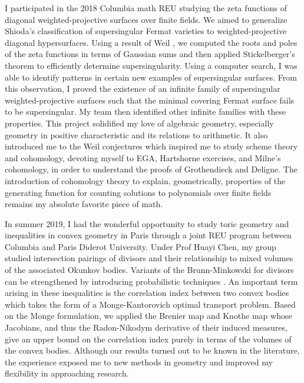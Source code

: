 \documentclass[11pt]{article}
\begin{document}
I participated in the 2018 Columbia math REU studying the zeta functions of diagonal weighted-projective surfaces over finite fields. We aimed to generalize Shioda’s classification of supersingular Fermat varieties  to weighted-projective diagonal hypersurfaces. Using a result of Weil , we computed the roots and poles of the zeta functions in terms of Gaussian sums and then applied Stickelberger's theorem to efficiently determine supersingularity. Using a computer search, I was able to identify patterns in certain new examples of supersingular surfaces. From this observation, I proved the existence of an infinite family of supersingular weighted-projective surfaces such that the minimal covering Fermat surface fails to be supersingular. My team then identified other infinite families with these properties. This project solidified my love of algebraic geometry, especially geometry in positive characteristic and its relations to arithmetic. It also introduced me to the Weil conjectures which inspired me to study scheme theory and \etale cohomology, devoting myself to EGA, Hartshorne exercises, and Milne's \etale cohomology, in order to understand the proofs of Grothendieck and Deligne. The introduction of \etale cohomology theory to explain, geometrically, properties of the generating function for counting solutions to polynomials over finite fields remains my absolute favorite piece of math. 
\par
In summer 2019, I had the wonderful opportunity to study toric geometry and inequalities in convex geometry in Paris through a joint REU program between Columbia and Paris Diderot University. Under Prof Huayi Chen, my group studied intersection pairings of divisors and their relationship to mixed volumes of the associated Okunkov bodies. Variants of the Brunn-Minkowski for divisors can be strengthened by introducing probabilistic techniques .
An important term arising in these inequalities is the correlation index between two convex bodies which takes the form of a Monge-Kantorovich optimal transport problem. Based on the Monge formulation, we applied the Brenier map and Knothe map whose Jacobians, and thus the Radon-Nikodym derivative of their induced measures, give an upper bound on the correlation index purely in terms of the volumes of the convex bodies. Although our results turned out to be known in the literature, the experience exposed me to new methods in geometry and improved my flexibility in approaching research.
\par
\end{document}
